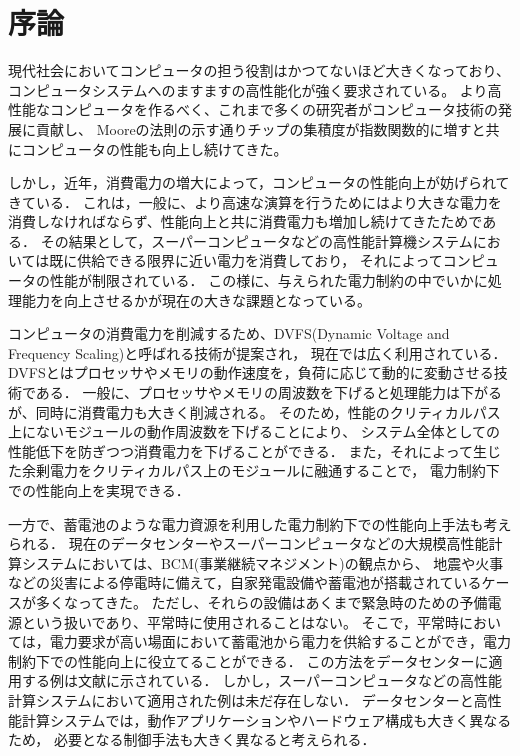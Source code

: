 \chapter{序論}

現代社会においてコンピュータの担う役割はかつてないほど大きくなっており、
コンピュータシステムへのますますの高性能化が強く要求されている。
より高性能なコンピュータを作るべく、これまで多くの研究者がコンピュータ技術の発展に貢献し、
Mooreの法則\cite{mooreslaw}の示す通りチップの集積度が指数関数的に増すと共にコンピュータの性能も向上し続けてきた。



しかし，近年，消費電力の増大によって，コンピュータの性能向上が妨げられてきている．
これは，一般に、より高速な演算を行うためにはより大きな電力を消費しなければならず、性能向上と共に消費電力も増加し続けてきたためである．
その結果として，スーパーコンピュータなどの高性能計算機システムにおいては既に供給できる限界に近い電力を消費しており，
それによってコンピュータの性能が制限されている．
この様に、与えられた電力制約の中でいかに処理能力を向上させるかが現在の大きな課題となっている。


コンピュータの消費電力を削減するため、DVFS(Dynamic Voltage and Frequency Scaling)と呼ばれる技術が提案され，
現在では広く利用されている．DVFSとはプロセッサやメモリの動作速度を，負荷に応じて動的に変動させる技術である．
一般に、プロセッサやメモリの周波数を下げると処理能力は下がるが、同時に消費電力も大きく削減される。
そのため，性能のクリティカルパス上にないモジュールの動作周波数を下げることにより、
システム全体としての性能低下を防ぎつつ消費電力を下げることができる．
また，それによって生じた余剰電力をクリティカルパス上のモジュールに融通することで，
電力制約下での性能向上を実現できる．



一方で、蓄電池のような電力資源を利用した電力制約下での性能向上手法も考えられる．
現在のデータセンターやスーパーコンピュータなどの大規模高性能計算システムにおいては、BCM(事業継続マネジメント)の観点から、
地震や火事などの災害による停電時に備えて，自家発電設備や蓄電池が搭載されているケースが多くなってきた。
ただし、それらの設備はあくまで緊急時のための予備電源という扱いであり、平常時に使用されることはない。
そこで，平常時においては，電力要求が高い場面において蓄電池から電力を供給することができ，電力制約下での性能向上に役立てることができる．
この方法をデータセンターに適用する例は文献\cite{Govindan:2011:BLT:2024723.2000105}に示されている．
しかし，スーパーコンピュータなどの高性能計算システムにおいて適用された例は未だ存在しない．
データセンターと高性能計算システムでは，動作アプリケーションやハードウェア構成も大きく異なるため，
必要となる制御手法も大きく異なると考えられる．


